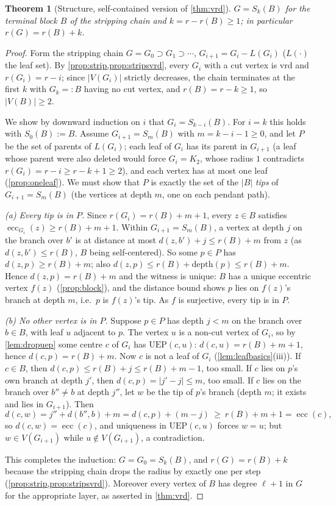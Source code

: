 \documentclass[11pt]{article}
\newtheorem{theorem}{Theorem}[section]
\theoremstyle{definition}
\newcommand{\ecc}{\operatorname{ecc}}
\begin{document}
\begin{theorem}[Structure, self-contained version of \cref{thm:vrd}]
\label{thm:vrdproof}
$G=S_k(B)$ for the terminal block $B$ of the stripping chain and
$k=r-r(B)\ge1$; in particular $r(G)=r(B)+k$.
\end{theorem}

\begin{proof}
Form the stripping chain $G=G_0\supset G_1\supset\cdots$,
$G_{i+1}=G_i-L(G_i)$ ($L(\cdot)$ the leaf set).  By
\cref{prop:strip,prop:stripsvrd}, every $G_i$ with a
cut vertex is vrd and $r(G_i)=r-i$; since $|V(G_i)|$ strictly decreases,
the chain terminates at the first $k$ with $G_k=:B$ having no cut vertex,
and $r(B)=r-k\ge1$, so $|V(B)|\ge2$.

We show by downward induction on $i$ that $G_i=S_{k-i}(B)$.
For $i=k$ this holds with $S_0(B):=B$.  Assume
$G_{i+1}=S_m(B)$ with $m=k-i-1\ge0$, and let $P$ be the set of parents of
$L(G_i)$; each leaf of $G_i$ has its parent in $G_{i+1}$ (a leaf whose
parent were also deleted would force $G_i=K_2$, whose radius $1$ contradicts
$r(G_i)=r-i\ge r-k+1\ge2$), and each vertex has at most one leaf
(\cref{prop:oneleaf}).  We must show that $P$ is exactly the set
of the $|B|$ \emph{tips} of $G_{i+1}=S_m(B)$ (the vertices at depth $m$,
one on each pendant path).

\emph{(a) Every tip is in $P$.}  Since $r(G_i)=r(B)+m+1$, every $z\in B$
satisfies $\ecc_{G_i}(z)\ge r(B)+m+1$.  Within $G_{i+1}=S_m(B)$, a vertex at
depth $j$ on the branch over $b'$ is at distance at most
$d(z,b')+j\le r(B)+m$ from $z$ (as $d(z,b')\le r(B)$, $B$ being
self-centered).  So some $p\in P$ has $d(z,p)\ge r(B)+m$; also
$d(z,p)\le r(B)+\mathrm{depth}(p)\le r(B)+m$.  Hence $d(z,p)=r(B)+m$ and the
witness is unique: $B$ has a unique eccentric vertex $f(z)$
(\cref{prop:block}), and the distance bound shows
$p$ lies on $f(z)$'s branch at depth $m$, i.e.\ $p$ is $f(z)$'s tip.  As
$f$ is surjective, every tip is in $P$.

\emph{(b) No other vertex is in $P$.}  Suppose $p\in P$ has depth $j<m$ on
the branch over $b\in B$, with leaf $u$ adjacent to $p$.  The vertex $u$ is
a non-cut vertex of $G_i$, so by \cref{lem:dropuep} some centre $c$ of
$G_i$ has $\mathrm{UEP}(c,u)$: $d(c,u)=r(B)+m+1$, hence $d(c,p)=r(B)+m$.
Now $c$ is not a leaf of $G_i$ (\cref{lem:leafbasics}(iii)).  If
$c\in B$, then $d(c,p)\le r(B)+j\le r(B)+m-1$, too small.  If $c$ lies on
$p$'s own branch at depth $j'$, then
$d(c,p)=|j'-j|\le m$, too small.  If $c$ lies on the branch over
$b''\ne b$ at depth $j''$, let $w$ be the tip
of $p$'s branch (depth $m$; it exists and lies in $G_{i+1}$).  Then
\[
 d(c,w)=j''+d(b'',b)+m=d(c,p)+(m-j)\ \ge\ r(B)+m+1=\ecc(c),
\]
so $d(c,w)=\ecc(c)$, and uniqueness in $\mathrm{UEP}(c,u)$ forces $w=u$;
but $w\in V(G_{i+1})$ while $u\notin V(G_{i+1})$, a contradiction.

This completes the induction: $G=G_0=S_k(B)$, and
$r(G)=r(B)+k$ because the stripping chain drops the radius by exactly one
per step (\cref{prop:strip,prop:stripsvrd}).
Moreover every vertex of $B$ has degree $\ell+1$ in $G$ for the appropriate
layer, as asserted in \cref{thm:vrd}.
\end{proof}
\end{document}
